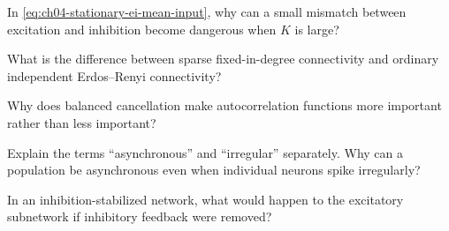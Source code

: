 \begin{conceptquestions}
  \item In \cref{eq:ch04-stationary-ei-mean-input}, why can a small mismatch between
  excitation and inhibition become dangerous when $K$ is large?

  \item What is the difference between sparse fixed-in-degree connectivity and
  ordinary independent Erdos--Renyi connectivity?

  \item Why does balanced cancellation make autocorrelation functions more
  important rather than less important?

  \item Explain the terms ``asynchronous'' and ``irregular'' separately. Why
  can a population be asynchronous even when individual neurons spike
  irregularly?

  \item In an inhibition-stabilized network, what would happen to the
  excitatory subnetwork if inhibitory feedback were removed?
\end{conceptquestions}

